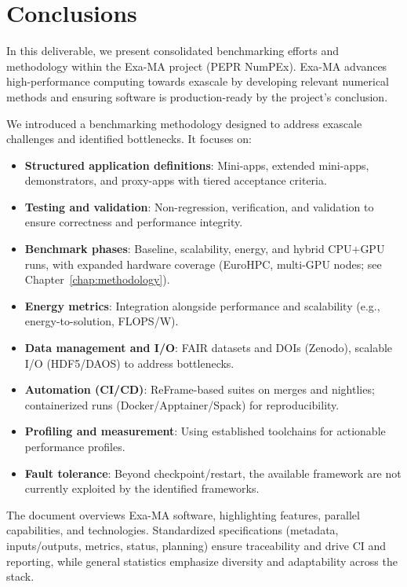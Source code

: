 
\clearpage
\section{Conclusions}
\label{sec:conclusions}

In this deliverable, we present consolidated benchmarking efforts and methodology within the Exa-MA project (PEPR NumPEx). 
Exa-MA advances high-performance computing towards exascale by developing relevant numerical methods and ensuring software is production-ready by the project's conclusion.

We introduced a benchmarking methodology designed to address exascale challenges and identified bottlenecks. 
It focuses on:

\begin{itemize}
    \item \textbf{Structured application definitions}: Mini-apps, extended mini-apps, demonstrators, and proxy-apps with tiered acceptance criteria.
    \item \textbf{Testing and validation}: Non-regression, verification, and validation to ensure correctness and performance integrity.
    \item \textbf{Benchmark phases}: Baseline, scalability, energy, and hybrid CPU+GPU runs, with expanded hardware coverage (EuroHPC, multi-GPU nodes; see Chapter~\ref{chap:methodology}).
    \item \textbf{Energy metrics}: Integration alongside performance and scalability (e.g., energy-to-solution, FLOPS/W).
    \item \textbf{Data management and I/O}: FAIR datasets and DOIs (Zenodo), scalable I/O (HDF5/DAOS) to address bottlenecks.
    \item \textbf{Automation (CI/CD)}: ReFrame-based suites on merges and nightlies; containerized runs (Docker/Apptainer/Spack) for reproducibility.
    \item \textbf{Profiling and measurement}: Using established toolchains for actionable performance profiles.
    \item \textbf{Fault tolerance}: Beyond checkpoint/restart, the available framework are not currently exploited by the identified frameworks.
\end{itemize}

The document overviews Exa-MA software, highlighting features, parallel capabilities, and technologies. Standardized specifications (metadata, inputs/outputs, metrics, status, planning) ensure traceability and drive CI and reporting, while general statistics emphasize diversity and adaptability across the stack.

